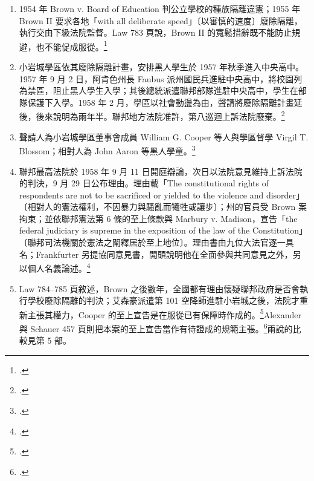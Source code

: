 \begin{enumerate}
\tightlist
\item
  1954 年 Brown v. Board of Education 判公立學校的種族隔離違憲；1955 年 Brown II 要求各地「with all deliberate speed」〔以審慎的速度〕廢除隔離，執行交由下級法院監督。Law 783 頁說，Brown II 的寬鬆措辭既不能防止規避，也不能促成服從。\footcite[783]{law2009}
\item
  小岩城學區依其廢除隔離計畫，安排黑人學生於 1957 年秋季進入中央高中。1957 年 9 月 2 日，阿肯色州長 Faubus 派州國民兵進駐中央高中，將校園列為禁區，阻止黑人學生入學；其後總統派遣聯邦部隊進駐中央高中，學生在部隊保護下入學。1958 年 2 月，學區以社會動盪為由，聲請將廢除隔離計畫延後，後來說明為兩年半。聯邦地方法院准許，第八巡迴上訴法院廢棄。\footcite{cooper1958}
\item
  聲請人為小岩城學區董事會成員 William G. Cooper 等人與學區督學 Virgil T. Blossom；相對人為 John Aaron 等黑人學童。\footcite{cooper1958}
\item
  聯邦最高法院於 1958 年 9 月 11 日開庭辯論，次日以法院意見維持上訴法院的判決，9 月 29 日公布理由。理由載「The constitutional rights of respondents are not to be sacrificed or yielded to the violence and disorder」〔相對人的憲法權利，不因暴力與騷亂而犧牲或讓步〕；州的官員受 Brown 案拘束；並依聯邦憲法第 6 條的至上條款與 Marbury v. Madison，宣告「the federal judiciary is supreme in the exposition of the law of the Constitution」〔聯邦司法機關於憲法之闡釋居於至上地位〕。理由書由九位大法官逐一具名；Frankfurter 另提協同意見書，開頭說明他在全面參與共同意見之外，另以個人名義論述。\footcite{cooper1958}
\item
  Law 784--785 頁敘述，Brown 之後數年，全國都有理由懷疑聯邦政府是否會執行學校廢除隔離的判決；艾森豪派遣第 101 空降師進駐小岩城之後，法院才重新主張其權力，Cooper 的至上宣告是在服從已有保障時作成的。\footcite[784--785 \& nn.196--198]{law2009}Alexander 與 Schauer 457 頁則把本案的至上宣告當作有待證成的規範主張。\footcite[457]{alexander2000}兩說的比較見第 5 部。
\end{enumerate}
